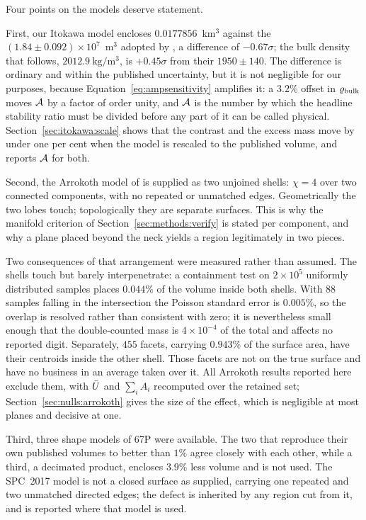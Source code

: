 Four points on the models deserve statement.

First, our Itokawa model encloses $0.0177856$~km$^3$ against the
$(1.84\pm0.092)\times10^{7}$~m$^3$ adopted by \citet{abe2006}, a
difference of $-0.67\sigma$; the bulk density that follows,
$\SI{2012.9}{\kilo\gram\per\cubic\metre}$, is $+0.45\sigma$ from their
$1950\pm140$. The difference is ordinary and within the published
uncertainty, but it is not negligible for our purposes, because
Equation~\eqref{eq:ampsensitivity} amplifies it: a $3.2\%$ offset in
$\varrho_{\mathrm{bulk}}$ moves $\mathcal{A}$ by a factor of order unity, and $\mathcal{A}$ is
the number by which the headline stability ratio must be divided before
any part of it can be called physical. Section~\ref{sec:itokawa:scale}
shows that the contrast and the excess mass move by under one per cent
when the model is rescaled to the published volume, and reports $\mathcal{A}$
for both.

Second, the Arrokoth model of \citet{porter2024} is supplied as two
unjoined shells: $\chi = 4$ over two connected components, with no
repeated or unmatched edges. Geometrically the two lobes touch;
topologically they are separate surfaces. This is why the manifold
criterion of Section~\ref{sec:methods:verify} is stated per component,
and why a plane placed beyond the neck yields a region legitimately in
two pieces.

Two consequences of that arrangement were measured rather than assumed.
The shells touch but barely interpenetrate: a containment test on
$2\times10^{5}$ uniformly distributed samples places $0.044\%$ of the
volume inside both shells. With $88$ samples falling in the intersection
the Poisson standard error is $0.005\%$, so the overlap is resolved
rather than consistent with zero; it is nevertheless small enough that
the double-counted mass is $4\times10^{-4}$ of the total and affects no
reported digit.
Separately, $455$ facets, carrying $0.943\%$ of the surface area, have
their centroids inside the other shell. Those facets are not on the true
surface and have no business in an average taken over it. All Arrokoth
results reported here exclude them, with $\bar{U}$ and $\sum_i A_i$
recomputed over the retained set; Section~\ref{sec:nulls:arrokoth} gives
the size of the effect, which is negligible at most planes and decisive
at one.

Third, three shape models of 67P were available. The two that reproduce
their own published volumes to better than $1\%$ agree closely with each
other, while a third, a decimated product, encloses $3.9\%$ less volume
and is not used. The SPC~2017 model is not a closed surface as supplied,
carrying one repeated and two unmatched directed edges; the defect is
inherited by any region cut from it, and is reported where that model is
used.

